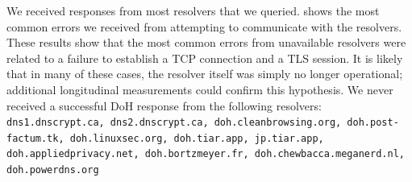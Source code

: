 We received responses from most resolvers that we queried.
 shows the most common errors we
received from attempting to communicate with the resolvers.
These results show that the most common errors from unavailable resolvers were
related to a failure to establish a TCP connection and a TLS session.
It is likely that in many of these cases, the resolver itself was simply no longer operational;
additional longitudinal measurements could confirm this hypothesis.
We never received a successful DoH response from the following resolvers: \texttt{dns1.dnscrypt.ca, dns2.dnscrypt.ca, doh.cleanbrowsing.org, doh.post-factum.tk, doh.linuxsec.org, doh.tiar.app, jp.tiar.app, doh.appliedprivacy.net, doh.bortzmeyer.fr, doh.chewbacca.meganerd.nl, doh.powerdns.org}

\begin{figure}[t!]
\hspace*{-1in}
\begin{minipage}{1.35\textwidth}
\hfill%
%
\hfill%
%

\end{minipage}
\end{figure}
